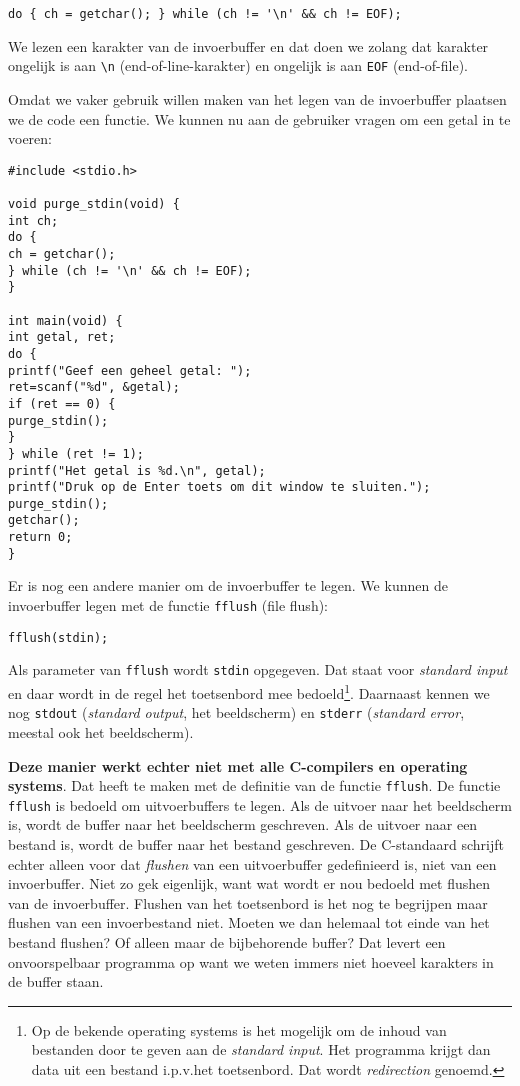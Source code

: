 \begin{lstlisting}
do { ch = getchar(); } while (ch != '\n' && ch != EOF);
\end{lstlisting}

We lezen een karakter van de invoerbuffer en dat doen we zolang dat karakter ongelijk is aan \lstinline|\n| (end-of-line-karakter) en ongelijk is aan \lstinline|EOF| (end-of-file).

Omdat we vaker gebruik willen maken van het legen van de invoerbuffer plaatsen we de code een functie. We kunnen nu aan de gebruiker vragen om een getal in te voeren:

\begin{lstlisting}
#include <stdio.h>

void purge_stdin(void) {
int ch;
do {
ch = getchar();
} while (ch != '\n' && ch != EOF);
}

int main(void) {
int getal, ret;
do {
printf("Geef een geheel getal: ");
ret=scanf("%d", &getal);
if (ret == 0) {
purge_stdin();
}
} while (ret != 1);
printf("Het getal is %d.\n", getal);
printf("Druk op de Enter toets om dit window te sluiten.");
purge_stdin();
getchar();
return 0;
}
\end{lstlisting}

Er is nog een andere manier om de invoerbuffer te legen. We kunnen de invoerbuffer legen met de functie \lstinline|fflush| (file flush):

\begin{lstlisting}
fflush(stdin);
\end{lstlisting}

Als parameter van \lstinline|fflush| wordt \lstinline|stdin| opgegeven. Dat staat voor \textsl{standard input} en daar wordt in de regel het toetsenbord mee bedoeld\footnote{Op de bekende operating systems is het mogelijk om de inhoud van bestanden door te geven aan de \textsl{standard input}. Het programma krijgt dan data uit een bestand i.p.v.\@ het toetsenbord. Dat wordt \textsl{redirection} genoemd.}. Daarnaast kennen we nog \lstinline|stdout| (\textsl{standard output}, het beeldscherm) en \lstinline|stderr| (\textsl{standard error}, meestal ook het beeldscherm).

\textbf{Deze manier werkt echter niet met alle C-compilers en operating systems}. Dat heeft te maken met de definitie van de functie \lstinline|fflush|. De functie \lstinline|fflush| is bedoeld om uitvoerbuffers te legen. Als de uitvoer naar het beeldscherm is, wordt de buffer naar het beeldscherm geschreven. Als de uitvoer naar een bestand is, wordt de buffer naar het bestand geschreven. De C-standaard schrijft echter alleen voor dat \textsl{flushen} van een uitvoerbuffer gedefinieerd is, niet van een invoerbuffer. Niet zo gek eigenlijk, want wat wordt er nou bedoeld met flushen van de invoerbuffer. Flushen van het toetsenbord is het nog te begrijpen maar flushen van een invoerbestand niet. Moeten we dan helemaal tot einde van het bestand flushen? Of alleen maar de bijbehorende buffer? Dat levert een onvoorspelbaar programma op want we weten immers niet hoeveel karakters in de buffer staan.

